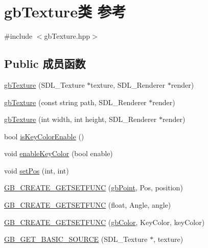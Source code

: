 \hypertarget{classgb_texture}{}\section{gb\+Texture类 参考}
\label{classgb_texture}


{\ttfamily \#include $<$gb\+Texture.\+hpp$>$}

\subsection*{Public 成员函数}
\begin{DoxyCompactItemize}
\item 
\mbox{\hyperlink{classgb_texture_a709b0b579fb9154b752ae50e165eb3d8}{gb\+Texture}} (S\+D\+L\+\_\+\+Texture $\ast$texture, S\+D\+L\+\_\+\+Renderer $\ast$render)
\item 
\mbox{\hyperlink{classgb_texture_ae90e7edb831d00f80d5d5a728638a6b6}{gb\+Texture}} (const string path, S\+D\+L\+\_\+\+Renderer $\ast$render)
\item 
\mbox{\hyperlink{classgb_texture_a2ee6447c6deb2f8559a949b48b9286de}{gb\+Texture}} (int width, int height, S\+D\+L\+\_\+\+Renderer $\ast$render)
\item 
bool \mbox{\hyperlink{classgb_texture_aea703943d871fb0efe4ac4646ed34a9c}{is\+Key\+Color\+Enable}} ()
\item 
void \mbox{\hyperlink{classgb_texture_af3065e3816833d038f9bf37af2f46306}{enable\+Key\+Color}} (bool enable)
\item 
void \mbox{\hyperlink{classgb_texture_af2eb84b34e37dfc36ce3ed6a20bffe8f}{set\+Pos}} (int, int)
\item 
\mbox{\hyperlink{classgb_texture_a786c7e0838dfe3ffd0da2488e30d8cff}{G\+B\+\_\+\+C\+R\+E\+A\+T\+E\+\_\+\+G\+E\+T\+S\+E\+T\+F\+U\+NC}} (\mbox{\hyperlink{classgb_point}{gb\+Point}}, Pos, position)
\item 
\mbox{\hyperlink{classgb_texture_ae5f63ab97092da9aad276c9455cafab8}{G\+B\+\_\+\+C\+R\+E\+A\+T\+E\+\_\+\+G\+E\+T\+S\+E\+T\+F\+U\+NC}} (float, Angle, angle)
\item 
\mbox{\hyperlink{classgb_texture_a0d3f3eb5103dc70d99d72483ce6aeea6}{G\+B\+\_\+\+C\+R\+E\+A\+T\+E\+\_\+\+G\+E\+T\+S\+E\+T\+F\+U\+NC}} (\mbox{\hyperlink{classgb_color}{gb\+Color}}, Key\+Color, key\+Color)
\item 
\mbox{\hyperlink{classgb_texture_ae20f0e9813df863f5a4a7b2a12330214}{G\+B\+\_\+\+G\+E\+T\+\_\+\+B\+A\+S\+I\+C\+\_\+\+S\+O\+U\+R\+CE}} (S\+D\+L\+\_\+\+Texture $\ast$, texture)

\end{DoxyCompactItemize}
